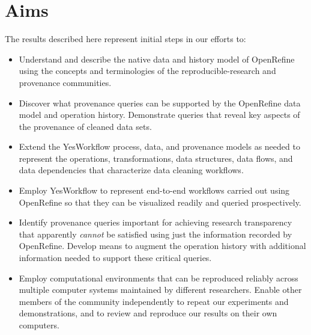 \section{Aims}

The results described here represent initial steps in our efforts to:

\begin{itemize}[label=\raisebox{0.25ex}{\tiny$\bullet$}]

\item Understand and describe the native data and history model of OpenRefine using the concepts and terminologies of the reproducible-research and provenance communities.

\item Discover what provenance queries can be supported by the OpenRefine data model and operation history.  Demonstrate queries that reveal key aspects of the provenance of cleaned data sets.

\item Extend the YesWorkflow process, data, and provenance models as needed to represent the operations, transformations, data structures, data flows, and data dependencies that characterize data cleaning workflows.  

\item Employ YesWorkflow to represent end-to-end workflows carried out using OpenRefine so that they can be visualized readily and queried prospectively.

\item Identify provenance queries important for achieving research transparency that apparently \emph{cannot} be satisfied using just the information recorded by OpenRefine. Develop means to augment the operation history with additional information needed to support these critical queries.

\item Employ computational environments that can be reproduced reliably across multiple computer systems maintained by different researchers. Enable other members of the community independently to repeat our experiments and demonstrations, and to review and reproduce our results on their own computers.

\end{itemize}
